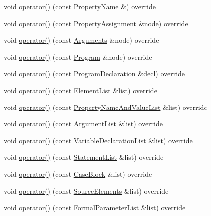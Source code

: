\begin{DoxyCompactItemize}
\item 
void \hyperlink{struct_basic_visitor_a4e82e722dc7c0cc04b1a39e0961b29f6}{operator()} (const \hyperlink{struct_property_name}{Property\+Name} \&) override
\item 
void \hyperlink{struct_basic_visitor_a3a868dc82a76118467f3a1ae4b1c92cd}{operator()} (const \hyperlink{struct_property_assignment}{Property\+Assignment} \&node) override
\item 
void \hyperlink{struct_basic_visitor_a8fecced7470cc28d2294c93e7df7ac1d}{operator()} (const \hyperlink{struct_arguments}{Arguments} \&node) override
\item 
void \hyperlink{struct_basic_visitor_adeaf13cc53c36c871d89d6f42a1ec8db}{operator()} (const \hyperlink{struct_program}{Program} \&node) override
\item 
void \hyperlink{struct_basic_visitor_a365071938626ac065ac413ba0e6d382f}{operator()} (const \hyperlink{struct_program_declaration}{Program\+Declaration} \&decl) override
\item 
void \hyperlink{struct_basic_visitor_ae04e6bd948d2f85acaff8744ad6ab0d7}{operator()} (const \hyperlink{struct_element_list}{Element\+List} \&list) override
\item 
void \hyperlink{struct_basic_visitor_a1cae5b2aa57d5214a6e89f6368ae5be1}{operator()} (const \hyperlink{struct_property_name_and_value_list}{Property\+Name\+And\+Value\+List} \&list) override
\item 
void \hyperlink{struct_basic_visitor_a3ebaf2b9a8a274df6d9960f1d6d8b6a6}{operator()} (const \hyperlink{struct_argument_list}{Argument\+List} \&list) override
\item 
void \hyperlink{struct_basic_visitor_aa04dfa4159f7711dcfd3d85ffab8ae88}{operator()} (const \hyperlink{struct_variable_declaration_list}{Variable\+Declaration\+List} \&list) override
\item 
void \hyperlink{struct_basic_visitor_a253a7061c246597f81f1122988704345}{operator()} (const \hyperlink{struct_statement_list}{Statement\+List} \&list) override
\item 
void \hyperlink{struct_basic_visitor_af108c842c7b483b2cb544dd77b171486}{operator()} (const \hyperlink{struct_case_block}{Case\+Block} \&list) override
\item 
void \hyperlink{struct_basic_visitor_a4cb8f522aa48db2270e3af61ee7b3370}{operator()} (const \hyperlink{struct_source_elements}{Source\+Elements} \&list) override
\item 
void \hyperlink{struct_basic_visitor_a3ce54960164c84e8d61c4c710362d6e3}{operator()} (const \hyperlink{struct_formal_parameter_list}{Formal\+Parameter\+List} \&list) override
\end{DoxyCompactItemize}


